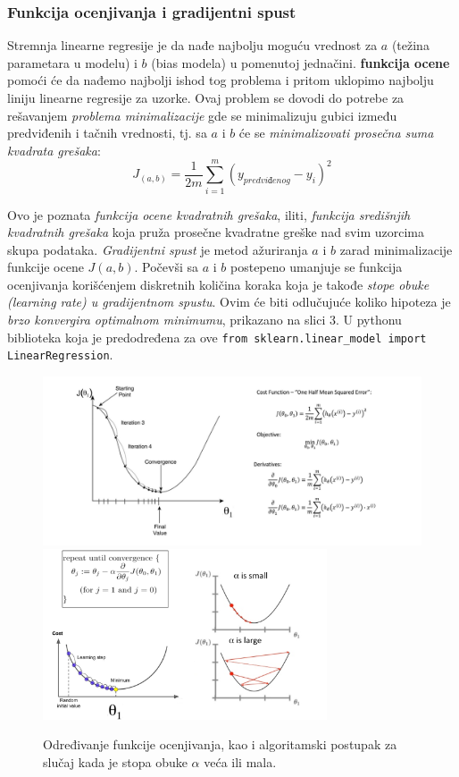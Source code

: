 \documentclass[fontsize=12bp, paper=a4]{scrarticle}
\begin{document}
\subsubsection{Funkcija ocenjivanja i gradijentni spust}
Stremnja linearne regresije je da nađe najbolju moguću vrednost za $a$ (težina parametara u modelu) i $b$ (bias modela) u pomenutoj jednačini.\cite{gfg} \textbf{funkcija ocene} pomoći će da nađemo najbolji ishod tog problema i pritom uklopimo najbolju liniju linearne regresije za uzorke. Ovaj problem se dovodi do potrebe za rešavanjem \textit{problema minimalizacije} gde se minimalizuju gubici između predviđenih i tačnih vrednosti, tj. sa $a$ i $b$ će se \textit{minimalizovati prosečna suma kvadrata grešaka}:
$$
J_{(a,b)} = \frac{1}{2m}\sum_{i=1}^{m} (y_{predviđenog} - y_i)^2
$$

Ovo je poznata \textit{funkcija ocene kvadratnih grešaka}, iliti, \textit{funkcija središnjih kvadratnih grešaka} koja pruža prosečne kvadratne greške nad svim uzorcima skupa podataka. \textit{Gradijentni spust} je metod ažuriranja $a$ i $b$ zarad minimalizacije funkcije ocene $J(a,b)$. Počevši sa $a$ i $b$ postepeno umanjuje se funkcija ocenjivanja korišćenjem diskretnih količina koraka koja je takođe \textit{stope obuke (learning rate) u gradijentnom spustu}. Ovim će biti odlučujuće koliko hipoteza je \textit{brzo konvergira optimalnom minimumu}, prikazano na slici 3. U pythonu biblioteka koja je predodređena za ove  \verb|from sklearn.linear_model import LinearRegression|.

\begin{figure}[h!]
    \centering
    \includegraphics[width=1\textwidth]{3.png}
    \includegraphics[width=0.75\textwidth]{3b.png}
    \caption{\centering Određivanje funkcije ocenjivanja, kao i algoritamski postupak za slučaj kada je stopa obuke $\alpha$ veća ili mala.}
\end{figure}
\end{document}
